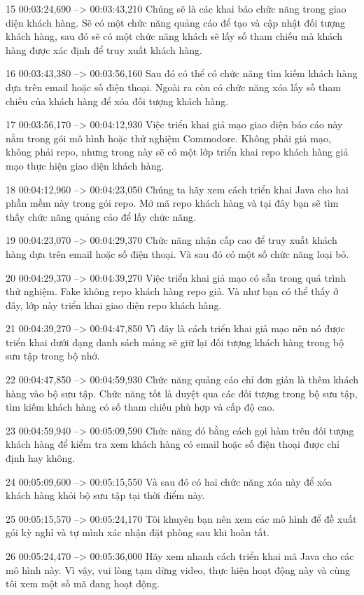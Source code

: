 15
00:03:24,690 --> 00:03:43,210
Chúng sẽ là các khai báo chức năng trong giao diện khách hàng.  Sẽ có một chức năng quảng cáo để tạo và cập nhật đối tượng khách hàng, sau đó sẽ có một chức năng khách sẽ lấy số tham chiếu mà khách hàng được xác định để truy xuất khách hàng.

16
00:03:43,380 --> 00:03:56,160
Sau đó có thể có chức năng tìm kiếm khách hàng dựa trên email hoặc số điện thoại.  Ngoài ra còn có chức năng xóa lấy số tham chiếu của khách hàng để xóa đối tượng khách hàng.

17
00:03:56,170 --> 00:04:12,930
Việc triển khai giả mạo giao diện báo cáo này nằm trong gói mô hình hoặc thử nghiệm Commodore.  Không phải giả mạo, không phải repo, nhưng trong này sẽ có một lớp triển khai repo khách hàng giả mạo thực hiện giao diện khách hàng.

18
00:04:12,960 --> 00:04:23,050
Chúng ta hãy xem cách triển khai Java cho hai phần mềm này trong gói repo.  Mở mã repo khách hàng và tại đây bạn sẽ tìm thấy chức năng quảng cáo để lấy chức năng.

19
00:04:23,070 --> 00:04:29,370
Chức năng nhận cấp cao để truy xuất khách hàng dựa trên email hoặc số điện thoại.  Và sau đó có một số chức năng loại bỏ.

20
00:04:29,370 --> 00:04:39,270
Việc triển khai giả mạo có sẵn trong quá trình thử nghiệm.  Fake không repo khách hàng repo giả.  Và như bạn có thể thấy ở đây, lớp này triển khai giao diện repo khách hàng.

21
00:04:39,270 --> 00:04:47,850
Vì đây là cách triển khai giả mạo nên nó được triển khai dưới dạng danh sách mảng sẽ giữ lại đối tượng khách hàng trong bộ sưu tập trong bộ nhớ.

22
00:04:47,850 --> 00:04:59,930
Chức năng quảng cáo chỉ đơn giản là thêm khách hàng vào bộ sưu tập.  Chức năng tốt là duyệt qua các đối tượng trong bộ sưu tập, tìm kiếm khách hàng có số tham chiếu phù hợp và cấp độ cao.

23
00:04:59,940 --> 00:05:09,590
Chức năng đó bằng cách gọi hàm trên đối tượng khách hàng để kiểm tra xem khách hàng có email hoặc số điện thoại được chỉ định hay không.

24
00:05:09,600 --> 00:05:15,550
Và sau đó có hai chức năng xóa này để xóa khách hàng khỏi bộ sưu tập tại thời điểm này.

25
00:05:15,570 --> 00:05:24,170
Tôi khuyên bạn nên xem các mô hình để đề xuất gói kỳ nghỉ và tự mình xác nhận đặt phòng sau khi hoàn tất.

26
00:05:24,470 --> 00:05:36,000
Hãy xem nhanh cách triển khai mã Java cho các mô hình này.  Vì vậy, vui lòng tạm dừng video, thực hiện hoạt động này và cùng tôi xem một số mã đang hoạt động.


